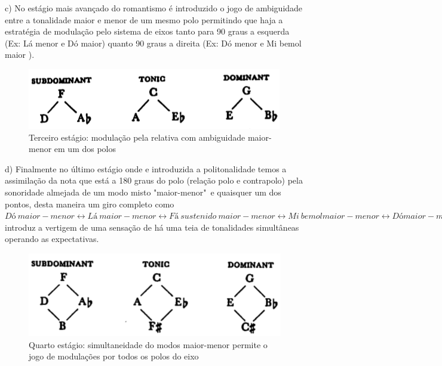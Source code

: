 \documentclass[
	12pt,				%
	openright,			%
	twoside,			%
	a4paper,			%
	english,			%
	french,				%
	spanish,			%
	brazil				%
	]{abntex2}
\begin{document}
c) No estágio mais avançado do romantismo é introduzido o jogo de ambiguidade entre a tonalidade maior e menor de um mesmo polo permitindo que haja a estratégia de modulação pelo sistema de eixos tanto para 90 graus a esquerda (Ex: Lá menor e Dó maior) quanto 90 graus a direita (Ex: Dó menor e Mi bemol maior ).

\begin{figure}[!h]
	\caption{\label{fig_grafico}Terceiro estágio: modulação pela relativa com ambiguidade maior-menor em um dos polos }
	\begin{center}
	    \includegraphics[scale=0.6]{axis/estagio03.png}
	\end{center}
\end{figure}


d) Finalmente no último estágio onde e introduzida a politonalidade temos a assimilação da nota que está a 180 graus do polo (relação polo e contrapolo) pela sonoridade almejada de um modo misto "maior-menor"\ e quaisquer um dos pontos, desta maneira um giro completo como $ Dó\ maior-menor \leftrightarrow Lá\ maior-menor \leftrightarrow Fá\ sustenido\ maior -menor \leftrightarrow Mi\ bemol maior-menor \leftrightarrow  Dó maior-menor $ introduz a vertigem de uma sensação de há uma teia de tonalidades simultâneas operando as expectativas.

\begin{figure}[!h]
	\caption{\label{fig_grafico}Quarto estágio: simultaneidade do modos maior-menor permite o jogo de modulações por todos os polos do eixo }
	\begin{center}
	    \includegraphics[scale=0.6]{axis/estagio04.png}
	\end{center}
\end{figure}
\end{document}
